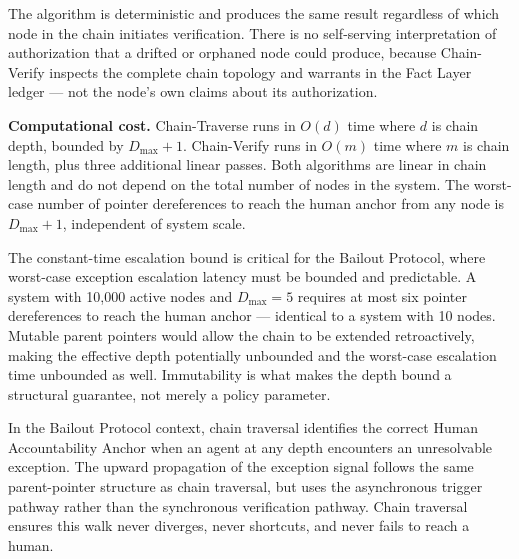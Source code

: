The algorithm is deterministic and produces the same result regardless of which node in the chain initiates verification. There is no self-serving interpretation of authorization that a drifted or orphaned node could produce, because Chain-Verify inspects the complete chain topology and warrants in the Fact Layer ledger — not the node's own claims about its authorization.

\medskip
\noindent\textbf{Computational cost.} Chain-Traverse runs in $O(d)$ time where $d$ is chain depth, bounded by $D_{\max} + 1$. Chain-Verify runs in $O(m)$ time where $m$ is chain length, plus three additional linear passes. Both algorithms are linear in chain length and do not depend on the total number of nodes in the system. The worst-case number of pointer dereferences to reach the human anchor from any node is $D_{\max} + 1$, independent of system scale.

The constant-time escalation bound is critical for the Bailout Protocol, where worst-case exception escalation latency must be bounded and predictable. A system with 10,000 active nodes and $D_{\max} = 5$ requires at most six pointer dereferences to reach the human anchor — identical to a system with 10 nodes. Mutable parent pointers would allow the chain to be extended retroactively, making the effective depth potentially unbounded and the worst-case escalation time unbounded as well. Immutability is what makes the depth bound a structural guarantee, not merely a policy parameter.

In the Bailout Protocol context, chain traversal identifies the correct Human Accountability Anchor when an agent at any depth encounters an unresolvable exception. The upward propagation of the exception signal follows the same parent-pointer structure as chain traversal, but uses the asynchronous trigger pathway rather than the synchronous verification pathway. Chain traversal ensures this walk never diverges, never shortcuts, and never fails to reach a human.
